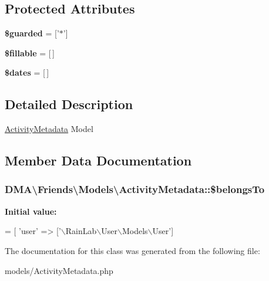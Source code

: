 \subsection*{Protected Attributes}
\begin{DoxyCompactItemize}
\item 
\hypertarget{classDMA_1_1Friends_1_1Models_1_1ActivityMetadata_ae295fa39a4e26ba207f9c606a9348957}{{\bfseries \$guarded} = \mbox{[}'$\ast$'\mbox{]}}\label{classDMA_1_1Friends_1_1Models_1_1ActivityMetadata_ae295fa39a4e26ba207f9c606a9348957}

\item 
\hypertarget{classDMA_1_1Friends_1_1Models_1_1ActivityMetadata_a057b7754ecf2cacfa7be3fa003cae61e}{{\bfseries \$fillable} = \mbox{[}$\,$\mbox{]}}\label{classDMA_1_1Friends_1_1Models_1_1ActivityMetadata_a057b7754ecf2cacfa7be3fa003cae61e}

\item 
\hypertarget{classDMA_1_1Friends_1_1Models_1_1ActivityMetadata_a88007f604baf0815d66368f4dbdf88aa}{{\bfseries \$dates} = \mbox{[}$\,$\mbox{]}}\label{classDMA_1_1Friends_1_1Models_1_1ActivityMetadata_a88007f604baf0815d66368f4dbdf88aa}

\end{DoxyCompactItemize}


\subsection{Detailed Description}
\hyperlink{classDMA_1_1Friends_1_1Models_1_1ActivityMetadata}{Activity\+Metadata} Model 

\subsection{Member Data Documentation}
\hypertarget{classDMA_1_1Friends_1_1Models_1_1ActivityMetadata_a41b080a3ea1f2019d7695e7825b449fe}{
\subsubsection[{\$belongs\+To}]{\setlength{\rightskip}{0pt plus 5cm}D\+M\+A\textbackslash{}\+Friends\textbackslash{}\+Models\textbackslash{}\+Activity\+Metadata\+::\$belongs\+To}}\label{classDMA_1_1Friends_1_1Models_1_1ActivityMetadata_a41b080a3ea1f2019d7695e7825b449fe}
{\bfseries Initial value\+:}
\begin{DoxyCode}
= [
        \textcolor{stringliteral}{'user'}      => [\textcolor{stringliteral}{'\(\backslash\)RainLab\(\backslash\)User\(\backslash\)Models\(\backslash\)User'}]
\end{DoxyCode}


The documentation for this class was generated from the following file\+:\begin{DoxyCompactItemize}
\item 
models/Activity\+Metadata.\+php\end{DoxyCompactItemize}
